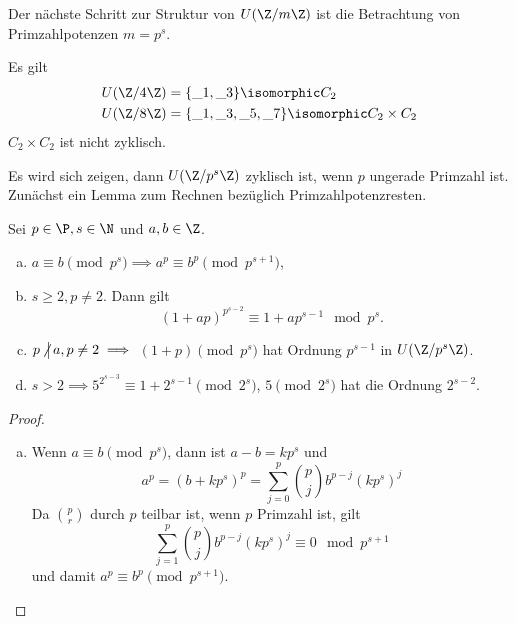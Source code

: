Der nächste Schritt zur Struktur von $U(\Z / m \Z)$ ist die Betrachtung von Primzahlpotenzen $m = p^s$.

\begin{ex*}
	Es gilt
	\begin{align*}
		U(\Z / 4 \Z) &= \{ \_ 1, \_ 3 \} \isomorphic C_2 \\
		U(\Z / 8 \Z) &= \{ \_ 1, \_ 3, \_ 5, \_ 7 \} \isomorphic C_2 \times C_2
	\end{align*}
	$C_2 \times C_2$ ist nicht zyklisch.
\end{ex*}

Es wird sich zeigen, dann $U(\Z / p^s \Z)$ zyklisch ist, wenn $p$ ungerade Primzahl ist.
Zunächst ein Lemma zum Rechnen bezüglich Primzahlpotenzresten.

\begin{lem} \label{2.7}
	Sei $p \in \P, s \in \N$ und $a, b \in \Z$.
	\begin{enumerate}[a)]
		\item
			$a \equiv b \pmod p^s \implies a^p \equiv b^p \pmod p^{s+1}$,
		\item
			$s \ge 2, p\neq 2$.
			Dann gilt
			\[
				(1 + ap)^{p^{s-2}}
				\equiv 1 + ap^{s-1} \mod p^s.
			\]
		\item
			$p \ndivs a, p \neq 2 \implies $ $(1+p) \pmod p^s$ hat Ordnung $p^{s-1}$ in $U(\Z / p^s \Z)$.
		\item
			$s > 2 \implies 5^{2^{s-3}} \equiv 1 + 2^{s-1} \pmod 2^s$, $5 \pmod 2^s$ hat die Ordnung $2^{s-2}$.
	\end{enumerate}
	\begin{proof}
		\begin{enumerate}[a)]
			\item
				Wenn $a \equiv b \pmod p^s$, dann ist $a - b = k p^s$ und
				\[
					a^p
					= (b + kp^s)^p
					= \sum_{j=0}^p \binom{p}{j} b^{p-j} (kp^s)^j
				\]
				Da $\binom{p}{r}$ durch $p$ teilbar ist, wenn $p$ Primzahl ist, gilt
				\[
					\sum_{j=1}^p \binom{p}{j} b^{p-j} (kp^s)^j \equiv 0 \mod p^{s+1}
				\]
				und damit $a^p \equiv b^p \pmod p^{s+1}$.
		\end{enumerate}
	\end{proof}
\end{lem}






